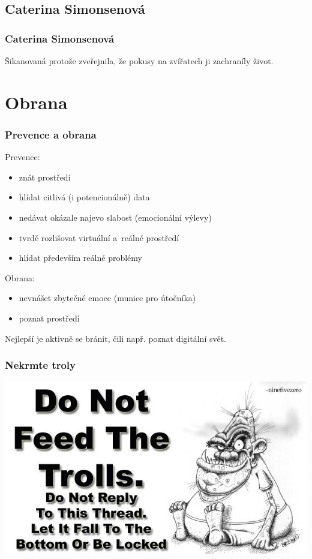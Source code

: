 \documentclass[xetex]{beamer}
\begin{document}
\subsection{Caterina Simonsenová}
\begin{frame}
	\frametitle{Caterina Simonsenová}

	Šikanovaná protože zveřejnila, že pokusy na zvířatech ji zachraníly život.
\end{frame}

\section{Obrana}
\begin{frame}
	\frametitle{Prevence a obrana}

Prevence:
	\begin{itemize}
		\item znát prostředí
		\item hlídat citlivá (i potencionálně) data
		\item nedávat okázale najevo slabost (emocionální výlevy)
		\item tvrdě rozlišovat virtuální a~reálné prostředí
		\item hlídat především reálné problémy
	\end{itemize}	

Obrana:
	\begin{itemize}
		\item nevnášet zbytečné emoce (munice pro útočníka)
		\item poznat prostředí
	\end{itemize}

	Nejlepší je aktivně se bránit, čili např. poznat digitální svět.
\end{frame}

\begin{frame}
	\frametitle{Nekrmte troly}
	\includegraphics[scale=0.45]{feed.the.troll.png}
\end{frame}
\end{document}
